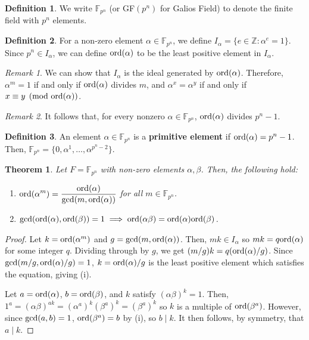 \documentclass[
    parskip=half,
    toc=flat,
    toc=sectionentrydotfill,
]{scrartcl}  %
\theoremstyle{definition}
\newtheorem{definition}{Definition}[section]
\theoremstyle{plain}
\newtheorem{theorem}{Theorem}[definition]
\theoremstyle{remark}
\newtheorem{remark}{Remark}[definition]
\newcommand{\F}{\mathbb{F}_{p^n}}
\renewcommand{\gcd}[1]{\textup{gcd}(#1)}
\newcommand{\ord}[1]{\textup{ord}(#1)}
\begin{document}
\begin{definition}
    We write $\F$ (or GF$(p^n)$ for Galios Field) to denote the finite field with $p^n$ elements.
\end{definition}

\begin{definition}
    For a non-zero element $\alpha\in\mathbb{F}_{p^n}$, we define $I_\alpha=\{e\in\mathbb{Z}:\alpha^e=1\}$.
    Since $p^n\in I_\alpha$, we can define $\ord\alpha$ to be the least positive element in $I_\alpha$.
\end{definition}

\begin{remark}
    We can show that $I_\alpha$ is the ideal generated by $\ord\alpha$.
    Therefore, $\alpha^m=1$ if and only if $\ord\alpha$ divides $m$, and $\alpha^x=\alpha^y$ if and only if
    $x\equiv y\pmod{\ord\alpha}$.
\end{remark}

\begin{remark}
    It follows that, for every nonzero $\alpha\in\mathbb{F}_{p^n}$, $\ord\alpha$ divides $p^n-1$.
\end{remark}

\begin{definition}
    An element $\alpha\in\mathbb{F}_{p^n}$ is a \textbf{primitive element} if $\ord\alpha=p^n-1$.
    Then, $\F=\{0,\alpha^1,\dots,\alpha^{p^n-2}\}$.
\end{definition}

\begin{theorem}
    \label{thm:finite field order operations}
    Let $F=\F$ with non-zero elements $\alpha,\beta$.
    Then, the following hold:
    \begin{enumerate}
        \item $\displaystyle\ord{\alpha^m}=\frac{\ord{\alpha}}{\gcd{m,\ord\alpha}}$ for all $m\in\F$.
        \item $\gcd{\ord\alpha,\ord\beta}=1\implies\ord{\alpha\beta}=\ord\alpha\ord\beta$.
    \end{enumerate}
\end{theorem}

\begin{proof}
    Let $k=\ord{\alpha^m}$ and $g=\gcd{m,\ord\alpha}$.
    Then, $mk\in I_\alpha$ so $mk=q\ord\alpha$ for some integer $q$.
    Dividing through by $g$, we get $(m/g)k=q(\ord\alpha/g)$.
    Since $\gcd{m/g,\ord\alpha/g}=1$, $k=\ord\alpha/g$ is the least positive element which satisfies the equation,
    giving (i).

    Let $a=\ord\alpha$, $b=\ord\beta$, and $k$ satisfy $(\alpha\beta)^k=1$.
    Then, $1^a=(\alpha\beta)^{ak}=(\alpha^a)^k(\beta^a)^k=(\beta^a)^k$ so $k$ is a multiple of $\ord{\beta^a}$.
    However, since $\gcd{a,b}=1$, $\ord{\beta^a}=b$ by (i), so $b\mid k$.
    It then follows, by symmetry, that $a\mid k$.
\end{proof}
\end{document}
